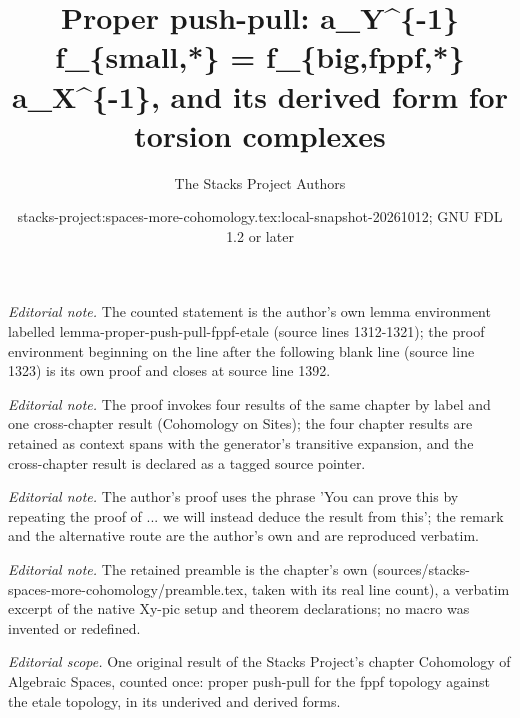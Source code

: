 \documentclass{stacks-project}
\title{Proper push-pull: a\_Y\textasciicircum{}\{-1\} f\_\{small,*\} = f\_\{big,fppf,*\} a\_X\textasciicircum{}\{-1\}, and its derived form for torsion complexes}
\author{The Stacks Project Authors}
\date{stacks-project:spaces-more-cohomology.tex:local-snapshot-20261012; GNU FDL 1.2 or later}
\theoremstyle{plain}
\theoremstyle{definition}
\theoremstyle{remark}
\numberwithin{equation}{subsection}
\begin{document}
\maketitle
\noindent\textit{Editorial note.} The counted statement is the author's own lemma environment labelled lemma-proper-push-pull-fppf-etale (source lines 1312-1321); the proof environment beginning on the line after the following blank line (source line 1323) is its own proof and closes at source line 1392.\par\medskip
\noindent\textit{Editorial note.} The proof invokes four results of the same chapter by label and one cross-chapter result (Cohomology on Sites); the four chapter results are retained as context spans with the generator's transitive expansion, and the cross-chapter result is declared as a tagged source pointer.\par\medskip
\noindent\textit{Editorial note.} The author's proof uses the phrase 'You can prove this by repeating the proof of ... we will instead deduce the result from this'; the remark and the alternative route are the author's own and are reproduced verbatim.\par\medskip
\noindent\textit{Editorial note.} The retained preamble is the chapter's own (sources/stacks-spaces-more-cohomology/preamble.tex, taken with its real line count), a verbatim excerpt of the native Xy-pic setup and theorem declarations; no macro was invented or redefined.\par\medskip
\noindent\textit{Editorial scope.} One original result of the Stacks Project's chapter Cohomology of Algebraic Spaces, counted once: proper push-pull for the fppf topology against the etale topology, in its underived and derived forms.\par\medskip
\end{document}
